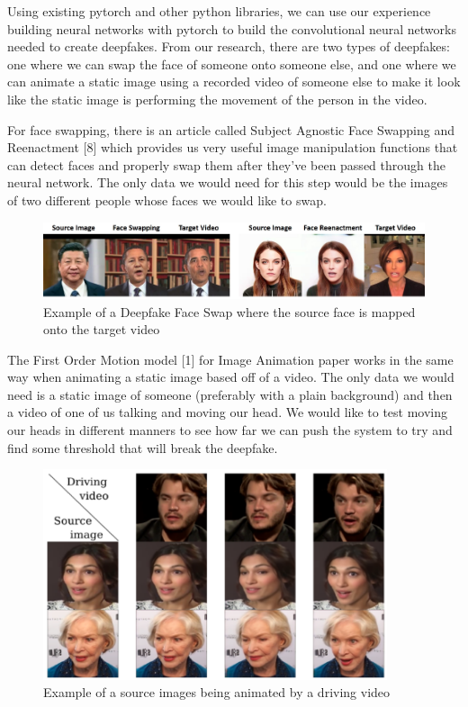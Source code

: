 \documentclass{article}
\begin{document}
Using existing pytorch and other python libraries, we can use our experience building neural networks with pytorch to build the convolutional neural networks needed to create deepfakes. From our research, there are two types of deepfakes: one where we can swap the face of someone onto someone else, and one where we can animate a static image using a recorded video of someone else to make it look like the static image is performing the movement of the person in the video. 

For face swapping, there is an article called Subject Agnostic Face Swapping and Reenactment [8] which provides us very useful image manipulation functions that can detect faces and properly swap them after they’ve been passed through the neural network. The only data we would need for this step would be the images of two different people whose faces we would like to swap. 

\begin{figure}[h]
\caption{Example of a Deepfake Face Swap where the source face is mapped onto the target video}
\centering
\includegraphics[width=1\textwidth]{faceswapping.png}
\end{figure}

The First Order Motion model [1] for Image Animation paper works in the same way when animating a static image based off of a video. The only data we would need is a static image of someone (preferably with a plain background) and then a video of one of us talking and moving our head. We would like to test moving our heads in different manners to see how far we can push the system to try and find some threshold that will break the deepfake. 

\begin{figure}[h]
\caption{Example of a source images being animated by a driving video}
\centering
\includegraphics[width=0.9\textwidth]{animation.png}
\end{figure}
\end{document}

